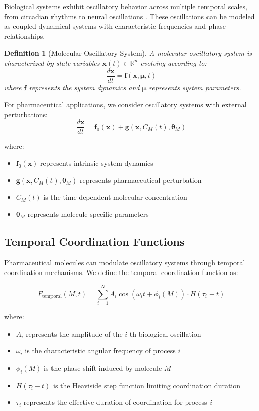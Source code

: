 \documentclass[12pt,a4paper]{article}
\newtheorem{definition}{Definition}[section]
\begin{document}
Biological systems exhibit oscillatory behavior across multiple temporal scales, from circadian rhythms to neural oscillations \citep{goldbeter1996biochemical, buzsaki2006rhythms}. These oscillations can be modeled as coupled dynamical systems with characteristic frequencies and phase relationships.

\begin{definition}[Molecular Oscillatory System]
A molecular oscillatory system is characterized by state variables $\mathbf{x}(t) \in \mathbb{R}^n$ evolving according to:
\begin{equation}
\frac{d\mathbf{x}}{dt} = \mathbf{f}(\mathbf{x}, \boldsymbol{\mu}, t)
\end{equation}
where $\mathbf{f}$ represents the system dynamics and $\boldsymbol{\mu}$ represents system parameters.
\end{definition}

For pharmaceutical applications, we consider oscillatory systems with external perturbations:
\begin{equation}
\frac{d\mathbf{x}}{dt} = \mathbf{f}_0(\mathbf{x}) + \mathbf{g}(\mathbf{x}, C_M(t), \boldsymbol{\theta}_M)
\end{equation}

where:
\begin{itemize}
\item $\mathbf{f}_0(\mathbf{x})$ represents intrinsic system dynamics
\item $\mathbf{g}(\mathbf{x}, C_M(t), \boldsymbol{\theta}_M)$ represents pharmaceutical perturbation
\item $C_M(t)$ is the time-dependent molecular concentration
\item $\boldsymbol{\theta}_M$ represents molecule-specific parameters
\end{itemize}

\subsection{Temporal Coordination Functions}

Pharmaceutical molecules can modulate oscillatory systems through temporal coordination mechanisms. We define the temporal coordination function as:

\begin{equation}
F_{\text{temporal}}(M, t) = \sum_{i=1}^{N} A_i \cos(\omega_i t + \phi_i(M)) \cdot H(\tau_i - t)
\end{equation}

where:
\begin{itemize}
\item $A_i$ represents the amplitude of the $i$-th biological oscillation
\item $\omega_i$ is the characteristic angular frequency of process $i$
\item $\phi_i(M)$ is the phase shift induced by molecule $M$
\item $H(\tau_i - t)$ is the Heaviside step function limiting coordination duration
\item $\tau_i$ represents the effective duration of coordination for process $i$
\end{itemize}
\end{document}

